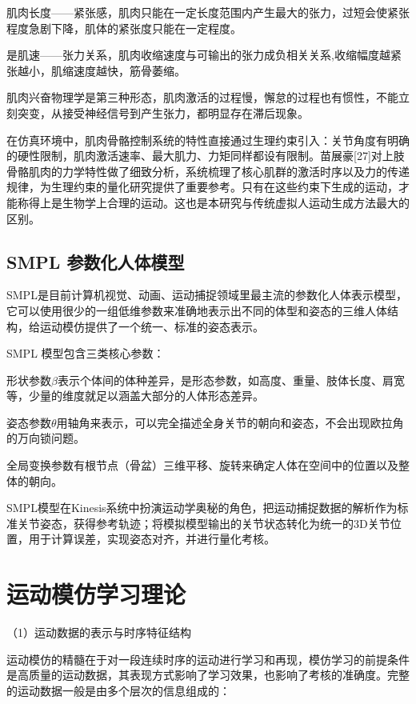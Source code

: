 肌肉长度——紧张感，肌肉只能在一定长度范围内产生最大的张力，过短会使紧张程度急剧下降，肌体的紧张度只能在一定程度。

是肌速——张力关系，肌肉收缩速度与可输出的张力成负相关关系,收缩幅度越紧张越小，肌缩速度越快，筋骨萎缩。

肌肉兴奋物理学是第三种形态，肌肉激活的过程慢，懈怠的过程也有惯性，不能立刻突变，从接受神经信号到产生张力，都明显存在滞后现象。

在仿真环境中，肌肉骨骼控制系统的特性直接通过生理约束引入：关节角度有明确的硬性限制，肌肉激活速率、最大肌力、力矩同样都设有限制。苗展豪[27]对上肢骨骼肌肉的力学特性做了细致分析，系统梳理了核心肌群的激活时序以及力的传递规律，为生理约束的量化研究提供了重要参考。只有在这些约束下生成的运动，才能称得上是生物学上合理的运动。这也是本研究与传统虚拟人运动生成方法最大的区别。

\subsection{SMPL 参数化人体模型}\label{smpl-ux53c2ux6570ux5316ux4ebaux4f53ux6a21ux578b}

SMPL是目前计算机视觉、动画、运动捕捉领域里最主流的参数化人体表示模型，它可以使用很少的一组低维参数来准确地表示出不同的体型和姿态的三维人体结构，给运动模仿提供了一个统一、标准的姿态表示。

SMPL 模型包含三类核心参数：

形状参数$\beta$表示个体间的体种差异，是形态参数，如高度、重量、肢体长度、肩宽等，少量的维度就足以涵盖大部分的人体形态差异。

姿态参数\emph{$\theta$}用轴角来表示，可以完全描述全身关节的朝向和姿态，不会出现欧拉角的万向锁问题。

全局变换参数有根节点（骨盆）三维平移、旋转来确定人体在空间中的位置以及整体的朝向。

SMPL模型在Kinesis系统中扮演运动学奥秘的角色，把运动捕捉数据的解析作为标准关节姿态，获得参考轨迹；将模拟模型输出的关节状态转化为统一的3D关节位置，用于计算误差，实现姿态对齐，并进行量化考核。

\section{运动模仿学习理论}\label{ux8fd0ux52a8ux6a21ux4effux5b66ux4e60ux7406ux8bba}

（1）运动数据的表示与时序特征结构

运动模仿的精髓在于对一段连续时序的运动进行学习和再现，模仿学习的前提条件是高质量的运动数据，其表现方式影响了学习效果，也影响了考核的准确度。完整的运动数据一般是由多个层次的信息组成的：

